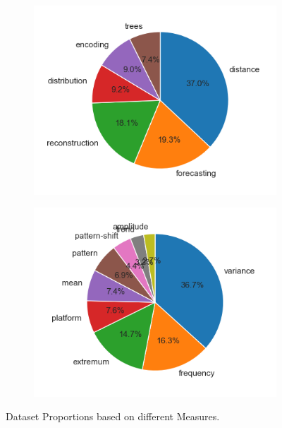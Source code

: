 \begin{figure}
    \centering
    \begin{subfigure}[b]{0.45\textwidth}
        \centering
        \includegraphics[width=\textwidth]{plots/distribution_plots_pie_bar/pie_overall_tax.png}
        \label{fig:pie_overall_tax}
    \end{subfigure}
    \hfill
    \begin{subfigure}[b]{0.45\textwidth}
        \centering
        \includegraphics[width=\textwidth]{plots/distribution_plots_pie_bar/pie_overall_anomaly.png}
        \label{fig:pie_overall_anomaly}
    \end{subfigure}
   
    \caption{Dataset Proportions based on different Measures.}
    \label{fig:overall_dist}
\end{figure}